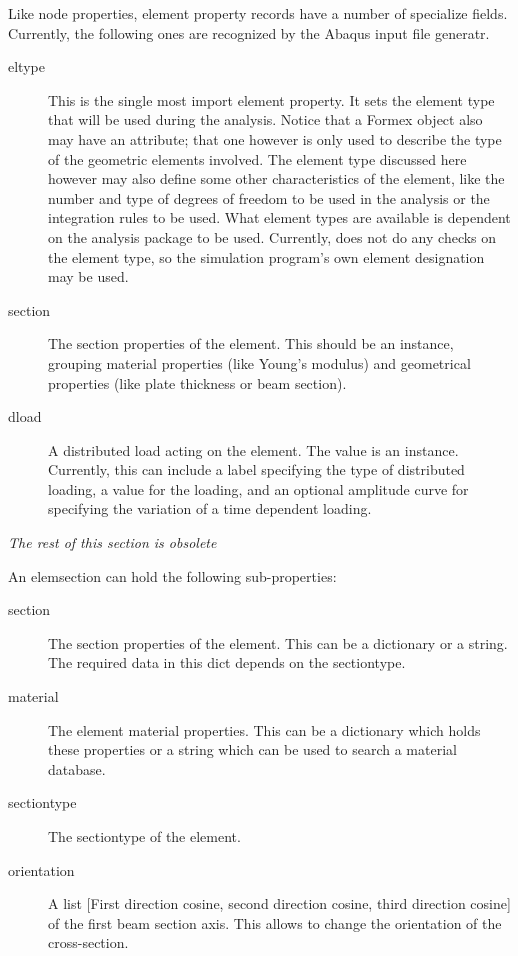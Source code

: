 {{{Like node properties, element property records have a number of specialize fields. Currently, the following ones are recognized by the Abaqus input file generatr.
\begin{description}
 \item [eltype] This is the single most import element property. It sets the element type that will be used during the analysis. Notice that a Formex object also may have an  attribute; that one however is only used to describe the type of the geometric elements involved. The element type discussed here however may also define some other characteristics of the element, like the number and type of degrees of freedom to be used in the analysis or the integration rules to be used. What element types are available is dependent on the analysis package to be used. Currently, \pyf does not do any checks on the element type, so the simulation program's own element designation may be used.
 \item[section] The section properties of the element. This should be an  instance, grouping material properties (like Young's modulus) and geometrical properties (like plate thickness or beam section).
 \item[dload] A distributed load acting on the element. The value is an  instance. Currently, this can include a label specifying the type of distributed loading, a value for the loading, and an optional amplitude curve for specifying the variation of a time dependent loading.  
\end{description}


\emph{The rest of this section is obsolete}

An elemsection can hold the following sub-properties:
\begin{description}
\item [section] The section properties of the element. This can be a dictionary or a string. The required data in this dict depends on the sectiontype. 
\item [material] The element material properties. This can be a dictionary which holds these properties or a string which can be used to search a material database. 
\item [sectiontype] The sectiontype of the element. 
\item [orientation]  A list [First direction cosine, second direction cosine, third direction cosine] of the first beam section axis. This allows to change the orientation of the cross-section.
\end{description}

}}}
